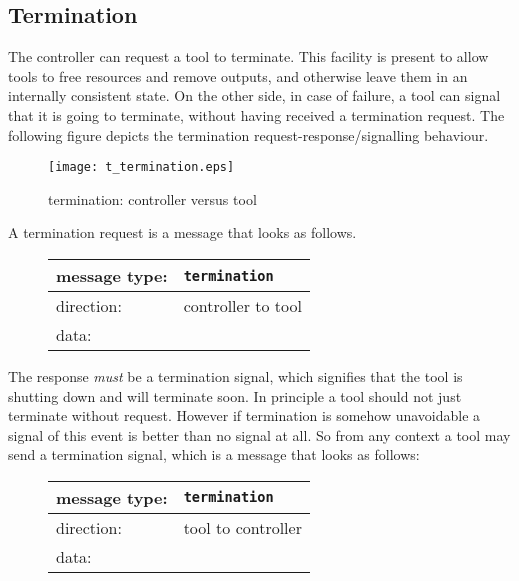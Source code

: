 \documentclass{article}
\newcommand{\msg}[1]{\texttt{#1}}
\begin{document}
  \subsection{Termination}

   The controller can request a tool to terminate. This facility is present to
   allow tools to free resources and remove outputs, and otherwise leave them
   in an internally consistent state. On the other side, in case of failure, a
   tool can signal that it is going to terminate, without having received a
   termination request. The following figure depicts the termination
   request-response/signalling behaviour.

   \begin{figure}[H]
    \begin{center}
     \texttt{[image: t\_termination.eps]}
    \end{center}
    \vspace{-0.3cm}
    \caption{termination: controller versus tool}
   \end{figure}

   \noindent A termination request is a message that looks as follows.

   \begin{figure}[H]
    \begin{center}
     \begin{tabular}{|ll|}
      \hline
       message type:    & \msg{termination} \\
      \hline
       direction:       & controller to tool \\
       data:            & \\
      \hline
     \end{tabular}
    \end{center}
   \end{figure}
   \vspace{-0.4cm}

   \noindent The response \emph{must} be a termination signal, which signifies
   that the tool is shutting down and will terminate soon.  In principle a tool
   should not just terminate without request. However if termination is somehow
   unavoidable a signal of this event is better than no signal at all.  So from
   any context a tool may send a termination signal, which is a message that
   looks as follows:

   \begin{figure}[H]
    \begin{center}
     \begin{tabular}{|ll|}
      \hline
       message type:   & \msg{termination} \\
      \hline
       direction:      & tool to controller \\
       data:           & \\
      \hline
     \end{tabular}
    \end{center}
   \end{figure}
   \vspace{-0.4cm}
\end{document}
